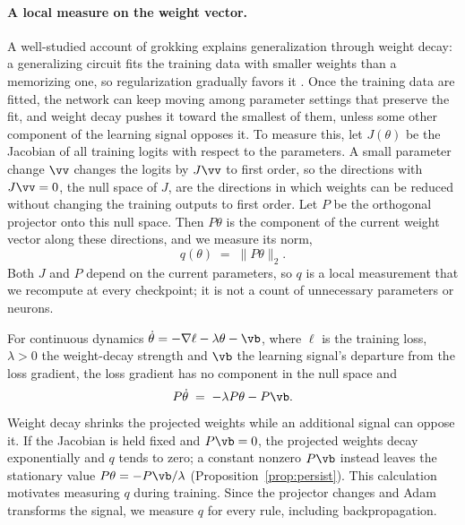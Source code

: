 \documentclass{article} %
\begin{document}
\paragraph{A local measure on the weight vector.} A well-studied account of grokking explains generalization through weight decay: a generalizing circuit fits the training data with smaller weights than a memorizing one, so regularization gradually favors it \citep{nanda2023progress,varma2023circuit,liu2022omnigrok}. Once the training data are fitted, the network can keep moving among parameter settings that preserve the fit, and weight decay pushes it toward the smallest of them, unless some other component of the learning signal opposes it. To measure this, let $J(\theta)$ be the Jacobian of all training logits with respect to the parameters. A small parameter change $\vv$ changes the logits by $J\vv$ to first order, so the directions with $J\vv = 0$, the null space of $J$, are the directions in which weights can be reduced without changing the training outputs to first order. Let $P$ be the orthogonal projector onto this null space. Then $P\theta$ is the component of the current weight vector along these directions, and we measure its norm,
\begin{equation}
q(\theta) \;=\; \|P\theta\|_2 .
\label{eq:flatmass}
\end{equation}
Both $J$ and $P$ depend on the current parameters, so $q$ is a local measurement that we recompute at every checkpoint; it is not a count of unnecessary parameters or neurons.

For continuous dynamics $\dot{\theta} = -\nabla \ell - \lambda\theta - \vb$, where $\ell$ is the training loss, $\lambda > 0$ the weight-decay strength and $\vb$ the learning signal's departure from the loss gradient, the loss gradient has no component in the null space and
\begin{equation*}
P\dot{\theta} \;=\; -\lambda P\theta - P\vb .
\end{equation*}
Weight decay shrinks the projected weights while an additional signal can oppose it. If the Jacobian is held fixed and $P\vb = 0$, the projected weights decay exponentially and $q$ tends to zero; a constant nonzero $P\vb$ instead leaves the stationary value $P\theta = -P\vb/\lambda$ (Proposition~\ref{prop:persist}). This calculation motivates measuring $q$ during training. Since the projector changes and Adam transforms the signal, we measure $q$ for every rule, including backpropagation.
\end{document}
